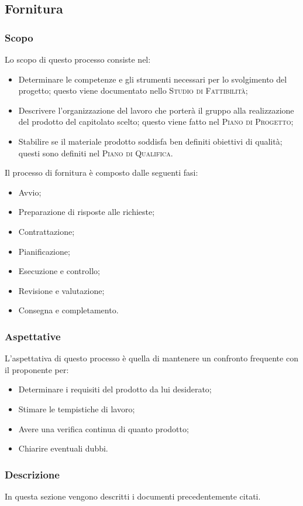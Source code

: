 \documentclass[../norme-di-progetto.tex]{subfiles}
\begin{document}
\subsection{Fornitura}
\subsubsection{Scopo}
Lo scopo di questo processo consiste nel:
\begin{itemize}
  \item Determinare le competenze e gli strumenti necessari per lo svolgimento del progetto; questo viene documentato nello \textsc{Studio di Fattibilità};
  \item Descrivere l'organizzazione del lavoro che porterà il gruppo alla realizzazione del prodotto del capitolato scelto; questo viene fatto nel \textsc{Piano di Progetto};
  \item Stabilire se il materiale prodotto soddisfa ben definiti obiettivi di qualità; questi sono definiti nel \textsc{Piano di Qualifica}.
\end{itemize}
Il processo di fornitura è composto dalle seguenti fasi:
\begin{itemize}
  \item Avvio;
  \item Preparazione di risposte alle richieste;
  \item Contrattazione;
  \item Pianificazione;
  \item Esecuzione e controllo;
  \item Revisione e valutazione;
  \item Consegna e completamento.
\end{itemize}
\subsubsection{Aspettative}
L'aspettativa di questo processo è quella di mantenere un confronto frequente con il proponente per:
\begin{itemize}
  \item Determinare i requisiti del prodotto da lui desiderato;
  \item Stimare le tempistiche di lavoro;
  \item Avere una verifica continua di quanto prodotto;
  \item Chiarire eventuali dubbi.
\end{itemize}
\subsubsection{Descrizione}
In questa sezione vengono descritti i documenti precedentemente citati.
\end{document}

